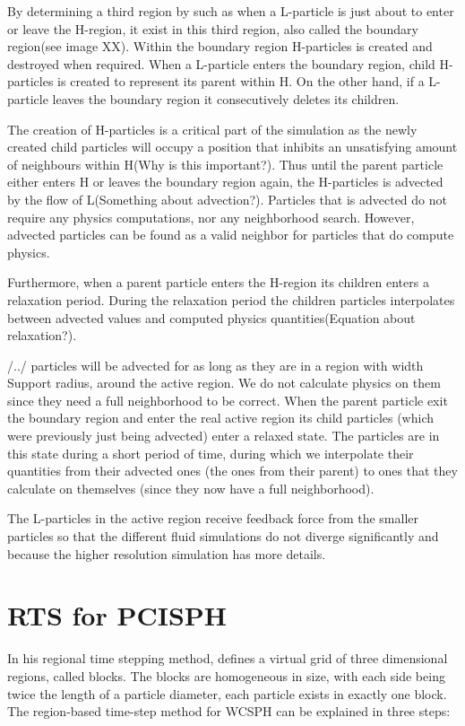 \documentclass[../../main.tex]{subfiles}
\begin{document}
By determining a third region by such as when a L-particle is just about to enter or leave the H-region, it exist in this third region, also called the boundary region(see image XX). Within the boundary region H-particles is created and destroyed when required. When a L-particle enters the boundary region, child H-particles is created to represent its parent within H. On the other hand, if a L-particle leaves the boundary region it consecutively deletes its children. 

The creation of H-particles is a critical part of the simulation as the newly created child particles will occupy a position that inhibits an unsatisfying amount of neighbours within H(Why is this important?). Thus until the parent particle either enters H or leaves the boundary region again, the H-particles is advected by the flow of L(Something about advection?). Particles that is advected do not require any physics computations, nor any neighborhood search. However, advected particles can be found as a valid neighbor for particles that do compute physics. 

Furthermore, when a parent particle enters the H-region its children enters a relaxation period. During the relaxation period the children particles interpolates between advected values and computed physics quantities(Equation about relaxation?). 

/../ particles will be advected for as long as they are in a region with width Support radius, around the active region. We do not calculate physics on them since they need a full neighborhood to be correct. When the parent particle exit the boundary region and enter the real active region its child particles (which were previously just being advected) enter a relaxed state. The particles are in this state during a short period of time, during which we interpolate their quantities from their advected ones (the ones from their parent) to ones that they calculate on themselves (since they now have a full neighborhood). 

The L-particles in the active region receive feedback force from the smaller particles so that the different fluid simulations do not diverge significantly and because the higher resolution simulation has more details. 

\section{RTS for PCISPH}
In his regional time stepping method, \citet{goswami2014regional} defines a virtual grid of three dimensional regions, called blocks. The blocks are homogeneous in size, with each side being twice the length of a particle diameter, each particle exists in exactly one block. The region-based time-step method for WCSPH can be explained in three steps:
\end{document}
